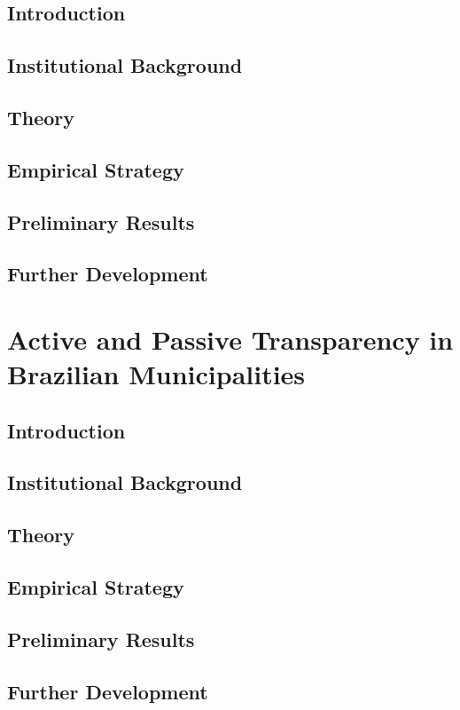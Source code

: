 \documentclass[11pt]{article}
\begin{document}
\subsection{Introduction}

\subsection{Institutional Background}

\subsection{Theory}

\subsection{Empirical Strategy}

\subsection{Preliminary Results}

\subsection{Further Development}

\clearpage

\section{Active and Passive Transparency in Brazilian Municipalities} \label{sec:paper3}

\subsection{Introduction}

\subsection{Institutional Background}

\subsection{Theory}

\subsection{Empirical Strategy}

\subsection{Preliminary Results}

\subsection{Further Development}

\clearpage

\setlength\bibsep{0pt}


\end{document}
